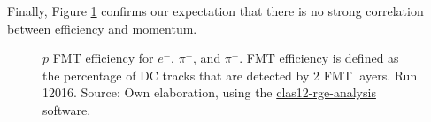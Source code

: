     Finally, Figure \ref{fig::14.14::fmt_efficiency_p} confirms our expectation that there is no strong correlation between efficiency and momentum.

    \begin{figure}[b!]
        \centering{}
        \caption[$p$ FMT efficiency for $e^-$, $\pi^+$, and $\pi^-$.
        Run 12016]{$p$ FMT efficiency for $e^-$, $\pi^+$, and $\pi^-$.
        FMT efficiency is defined as the percentage of DC tracks that are detected by 2 FMT layers.
        Run 12016.
        Source: Own elaboration, using the \href{https://github.com/bleaktwig/clas12-rge-analysis}{clas12-rge-analysis} software.}
        \label{fig::14.14::fmt_efficiency_p}
    \end{figure}
